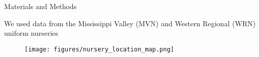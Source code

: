 \documentclass[final]{beamer}
\newlength{\onecolwid}
\begin{document}
\begin{frame}[t]
\begin{columns}[t]
\begin{column}{\onecolwid}
%
%
%
%
%





\begin{block}{Materials and Methods}

We used data from the Mississippi Valley (MVN) and Western Regional (WRN) uniform nurseries

\begin{figure}
  \begin{center}
    \texttt{[image: figures/nursery\_location\_map.png]}
  \end{center}
\end{figure}

\begin{footnotesize}


\end{footnotesize}
\end{block}
\end{column}
\end{columns}
\end{frame}
\end{document}
